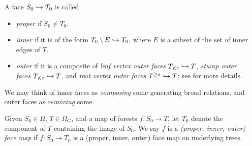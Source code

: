 \documentclass[a4paper,10pt,draft]{article}%
\begin{document}
\begin{definition}
      A face $S_0 \hookrightarrow T_0$ is called
      \begin{itemize}
      \item \textit{proper} if $S_0 \neq T_0$.
      \item \textit{inner} if it is of the form $T_0 \setminus E \hookrightarrow T_0$, where $E$ is a subset of the set of inner edges of $T$.
      \item \textit{outer} if it is a composite of
            \textit{leaf vertex outer faces} $T_{\not< e}\hookrightarrow T$,
            \textit{stump outer faces} $T_{\not< e}\hookrightarrow T$,
            and \textit{root vertex outer faces} $T^{\geq e} \hookrightarrow T$;
            see \cite[Notation 5.41]{Per17} for more details.
      \end{itemize}
\end{definition}

\begin{remark}
      We may think of inner faces as \textit{composing} some generating broad relations,
      and outer faces as \textit{removing} some.
\end{remark}

\begin{definition}
      Given $S_0 \in \Omega$, $T \in \Omega_G$, and a map of forests $f: S_0 \to T$, let
      $T_0$ denote the component of $T$ containing the image of $S_0$.
      We say $f$ is a \textit{(proper, inner, outer) face map} if
      $f: S_0 \to T_0$ is a (proper, inner, outer) face map on underlying trees.
\end{definition}


\end{document}
